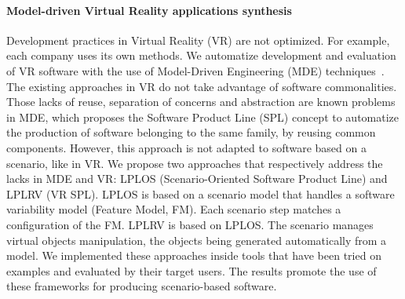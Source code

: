 \paragraph{Model-driven Virtual Reality applications synthesis}

Development practices in Virtual Reality (VR) are not optimized. For example, each company uses its own methods. We automatize development and evaluation of VR software with the use of Model-Driven Engineering (MDE) techniques~\cite{TODOTheseGwendal}. The existing approaches in VR do not take advantage of software commonalities. Those lacks of reuse, separation of concerns and abstraction are known problems in MDE, which proposes the Software Product Line (SPL) concept to automatize the
production of software belonging to the same family, by reusing common components. However, this approach is not adapted to software based on a scenario, like in VR.
We propose two approaches that respectively address the lacks in MDE and VR: LPLOS (Scenario-Oriented Software Product Line) and LPLRV (VR SPL). LPLOS is based on a scenario model that handles a software variability model (Feature Model, FM). Each scenario step matches a configuration of the FM. LPLRV is based on LPLOS. The scenario manages virtual objects manipulation, the objects being generated automatically from a model. We implemented these approaches inside tools that have been tried on examples and evaluated by their target users. The results promote the use of these frameworks for producing scenario-based software.






